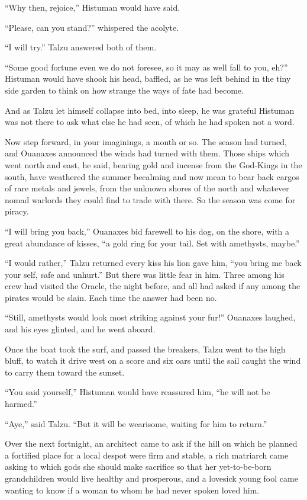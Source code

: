 ``Why then, rejoice,'' Histuman would have said.

``Please, can you stand?'' whispered the acolyte.

``I will try.'' Talzu answered both of them.

``Some good fortune even we do not foresee, so it may as well fall to you, eh?'' Histuman would have shook his head, baffled, as he was left behind in the tiny side garden to think on how strange the ways of fate had become.

And as Talzu let himself collapse into bed, into sleep, he was grateful Histuman was not there to ask what else he had seen, of which he had spoken not a word.

Now step forward, in your imaginings, a month or so. The season had turned, and Ouanaxes announced the winds had turned with them. Those ships which went north and east, he said, bearing gold and incense from the God-Kings in the south, have weathered the summer becalming and now mean to bear back cargos of rare metals and jewels, from the unknown shores of the north and whatever nomad warlords they could find to trade with there. So the season was come for piracy.

``I will bring you back,'' Ouanaxes bid farewell to his dog, on the shore, with a great abundance of kisses, ``a gold ring for your tail. Set with amethysts, maybe.''

``I would rather,'' Talzu returned every kiss his lion gave him, ``you bring me back your self, safe and unhurt.'' But there was little fear in him. Three among his crew had visited the Oracle, the night before, and all had asked if any among the pirates would be slain. Each time the answer had been no.

``Still, amethysts would look most striking against your fur!'' Ouanaxes laughed, and his eyes glinted, and he went aboard.

Once the boat took the surf, and passed the breakers, Talzu went to the high bluff, to watch it drive west on a score and six oars until the sail caught the wind to carry them toward the sunset.

``You said yourself,'' Histuman would have reassured him, ``he will not be harmed.''

``Aye,'' said Talzu. ``But it will be wearisome, waiting for him to return.''

Over the next fortnight, an architect came to ask if the hill on which he planned a fortified place for a local despot were firm and stable, a rich matriarch came asking to which gods she should make sacrifice so that her yet-to-be-born grandchildren would live healthy and prosperous, and a lovesick young fool came wanting to know if a woman to whom he had never spoken loved him.

